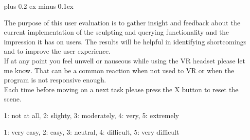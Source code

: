 \def\<#1>{\textsc{#1}}
\parindent0pt
\parskip5pt plus 0.2 ex minus 0.1ex

% 

The purpose of this user evaluation is to gather insight and feedback about the current implementation
of the sculpting and querying functionality and the impression it has on users. The results will be
helpful in identifying shortcomings and to improve the user experience.\\ \hfill
If at any point you feel unwell or nauseous while using the VR headset please let me know. That can be a common reaction when not used
to VR or when the program is not responsive enough.\\ \hfill
Each time before moving on a next task please press the X  button to reset the scene.



\hfill \break
{}

1: not at all, 2: slighty, 3: moderately, 4: very, 5: extremely \newline





\hfill \break
{}

1: very easy, 2: easy, 3: neutral, 4: difficult, 5: very difficult \newline

